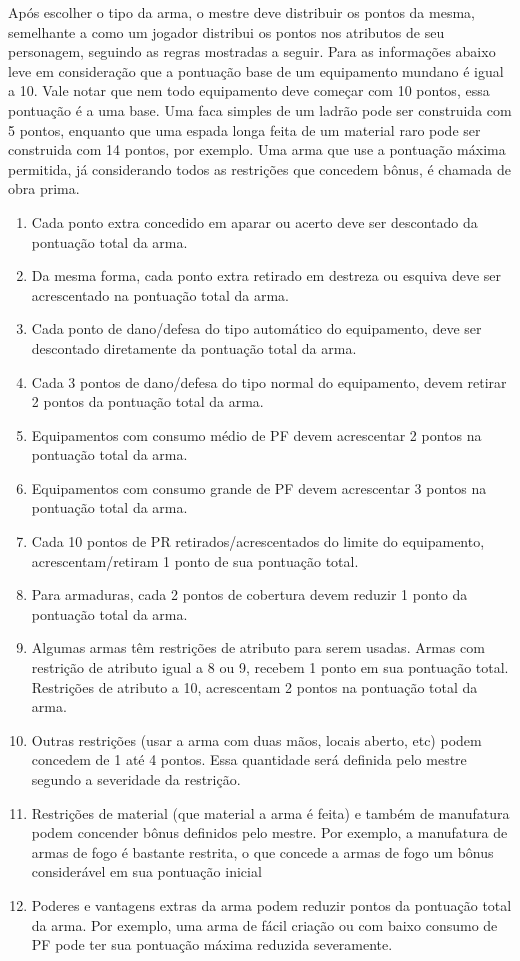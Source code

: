 Após escolher o tipo da arma, o mestre deve distribuir os pontos da mesma, semelhante a como um jogador distribui os pontos nos atributos de seu personagem, seguindo as regras mostradas a seguir. Para as informações abaixo leve em consideração que a pontuação base de um equipamento mundano é igual a 10. Vale notar que nem todo equipamento deve começar com 10 pontos, essa pontuação é a uma base. Uma faca simples de um ladrão pode ser construida com 5 pontos, enquanto que uma espada longa feita de um material raro pode ser construida com 14 pontos, por exemplo. Uma arma que use a pontuação máxima permitida, já considerando todos as restrições que concedem bônus, é chamada de obra prima.

\begin{enumerate}
	\item Cada ponto extra concedido em aparar ou acerto deve ser descontado da pontuação total da arma.
	\item Da mesma forma, cada ponto extra retirado em destreza ou esquiva deve ser acrescentado na pontuação total da arma.
	\item Cada ponto de dano/defesa do tipo automático do equipamento, deve ser descontado diretamente da pontuação total da arma.
	\item Cada 3 pontos de dano/defesa do tipo normal do equipamento, devem retirar 2 pontos da pontuação total da arma.
	\item Equipamentos com consumo médio de PF devem acrescentar 2 pontos na pontuação total da arma.
	\item Equipamentos com consumo grande de PF devem acrescentar 3 pontos na pontuação total da arma.
	\item Cada 10 pontos de PR retirados/acrescentados do limite do equipamento, acrescentam/retiram 1 ponto de sua pontuação total.
	\item Para armaduras, cada 2 pontos de cobertura devem reduzir 1 ponto da pontuação total da arma.
	\item Algumas armas têm restrições de atributo para serem usadas. Armas com restrição de atributo igual a 8 ou 9, recebem 1 ponto em sua pontuação total. Restrições de atributo a 10, acrescentam 2 pontos na pontuação total da arma.
	\item Outras restrições (usar a arma com duas mãos, locais aberto, etc) podem concedem de 1 até 4 pontos. Essa quantidade será definida pelo mestre segundo a severidade da restrição. 
	\item Restrições de material (que material a arma é feita) e também de manufatura podem concender bônus definidos pelo mestre. Por exemplo, a manufatura de armas de fogo é bastante restrita, o que concede a armas de fogo um bônus considerável em sua pontuação inicial
	\item Poderes e vantagens extras da arma podem reduzir pontos da pontuação total da arma. Por exemplo, uma arma de fácil criação ou com baixo consumo de PF pode ter sua pontuação máxima reduzida severamente.
\end{enumerate}

